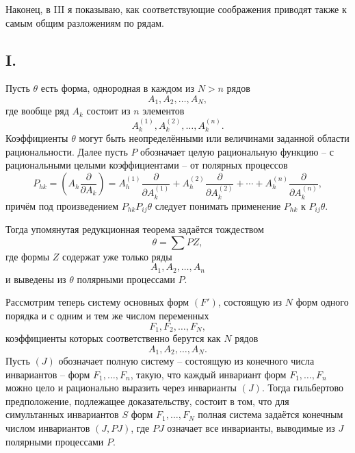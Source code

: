 \documentclass[11pt]{article}
\begin{document}
Наконец, в III я показываю, как соответствующие соображения приводят также к самым общим разложениям по рядам.

\subsection*{I.}
Пусть $\theta$ есть форма, однородная в каждом из $N>n$ рядов
\[
  A_1,A_2,\ldots,A_N,
\]
где вообще ряд $A_k$ состоит из $n$ элементов
\[
  A_k^{(1)},A_k^{(2)},\ldots,A_k^{(n)}.
\]
Коэффициенты $\theta$ могут быть неопределёнными или величинами заданной области рациональности. Далее пусть $P$ обозначает целую рациональную функцию -- с рациональными целыми коэффициентами -- от полярных процессов
\[
  P_{hk}=\left(A_h\frac{\partial}{\partial A_k}\right)
  =A_h^{(1)}\frac{\partial}{\partial A_k^{(1)}}+
   A_h^{(2)}\frac{\partial}{\partial A_k^{(2)}}+
   \cdots+
   A_h^{(n)}\frac{\partial}{\partial A_k^{(n)}},
\]
причём под произведением $P_{hk}P_{ij}\theta$ следует понимать применение $P_{hk}$ к $P_{ij}\theta$.

Тогда упомянутая редукционная теорема задаётся тождеством
\begin{equation}
  \theta=\sum PZ,
\tag{1}
\end{equation}
где формы $Z$ содержат уже только ряды
\[
  A_1,A_2,\ldots,A_n
\]
и выведены из $\theta$ полярными процессами $P$.

Рассмотрим теперь систему основных форм $(F')$, состоящую из $N$ форм одного порядка и с одним и тем же числом переменных
\[
  F_1,F_2,\ldots,F_N,
\]
коэффициенты которых соответственно берутся как $N$ рядов
\[
  A_1,A_2,\ldots,A_N.
\]
Пусть $(J)$ обозначает полную систему -- состоящую из конечного числа инвариантов -- форм $F_1,\ldots,F_n$, такую, что каждый инвариант форм $F_1,\ldots,F_n$ можно цело и рационально выразить через инварианты $(J)$. Тогда гильбертово предположение, подлежащее доказательству, состоит в том, что для симультанных инвариантов $S$ форм $F_1,\ldots,F_N$ полная система задаётся конечным числом инвариантов $(J,PJ)$, где $PJ$ означает все инварианты, выводимые из $J$ полярными процессами $P$.
\end{document}

